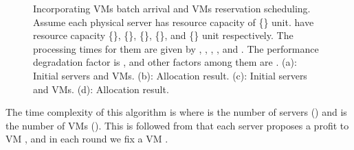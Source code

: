 \documentclass[10pt,journal]{IEEEtran}
\begin{document}
\begin{figure}
\caption{\label{fig:behaviour_IVP}Incorporating VMs batch arrival and VMs reservation scheduling. Assume each physical server has resource capacity of \{\} unit.  have resource capacity \{\}, \{\}, \{\}, \{\}, and \{\} unit respectively. The processing times for them are given by , , , , and . The performance degradation factor  is , and other factors among them are . (a):  Initial servers and VMs. (b):  Allocation result. (c):  Initial servers and VMs. (d):  Allocation result.}
\end{figure}

The time complexity of this algorithm is  where  is the number of servers () and  is the number of VMs (). This is followed from that each server  proposes a profit to VM , and in each round we fix a VM .
\end{document}

